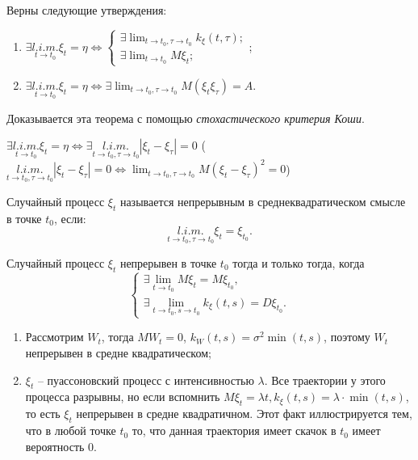 \begin{theorem}
  Верны следующие утверждения:

  \begin{enumerate}
    \item $\exists \underset{t \to t_0}{l.i.m.} \xi_t = \eta \Leftrightarrow
      \begin{cases}
        \exists \lim_{t\to t_0, \tau \to t_0} k_{\xi} (t, \tau); \\
        \exists \lim_{t\to t_0} M \xi_t;
      \end{cases}$;
  \item $\exists \underset{t \to t_0}{l.i.m.} \xi_t = \eta \Leftrightarrow
    \exists \lim_{t\to t_0, \tau \to t_0} M(\xi_t \xi_\tau) = A$.
  \end{enumerate}
\end{theorem}

Доказывается эта теорема с помощью \emph{стохастического критерия Коши}.

\begin{theorem}
  $\exists \underset{t \to t_0}{l.i.m.} \xi_t = \eta \Leftrightarrow
  \exists \underset{t \to t_0, \tau \to t_0}{l.i.m.} |\xi_t - \xi_\tau| = 0$
  ($\underset{t \to t_0, \tau \to t_0}{l.i.m.} |\xi_t - \xi_\tau| = 0
  \Leftrightarrow \lim_{t\to t_0, \tau\to t_0} M(\xi_t - \xi_\tau)^2 = 0$)
\end{theorem}


\begin{definition}
  Случайный процесс $\xi_t$ называется непрерывным в среднеквадратическом смысле
  в точке $t_0$, если:
  \[
    \underset{t \to t_0, \tau \to t_0}{l.i.m.} \xi_t = \xi_{t_0}.
  \]
\end{definition}

\begin{theorem}
  Случайный процесс $\xi_t$ непрерывен в точке $t_0$ тогда и только тогда, когда
  \[
    \begin{cases}
      \exists \lim_{t \to t_0} M\xi_t = M\xi_{t_0}, \\
      \exists \lim_{t \to t_0, s\to t_0} k_\xi(t, s) = D\xi_{t_0}.
    \end{cases}
  \]
\end{theorem}

\begin{ex}
  \begin{enumerate}
    \item Рассмотрим $W_t$, тогда $MW_t = 0$, $k_W(t, s) = \sigma^2 \min(t, s)$,
      поэтому $W_t$ непрерывен в средне квадратическом;
    \item $\xi_t$ -- пуассоновский процесс с интенсивностью $\lambda$. Все траектории у 
      этого процесса разрывны, но если вспомнить $M\xi_t = \lambda t, k_\xi(t, s) = \lambda \cdot \min(t, s)$, то есть $\xi_t$ непрерывен в средне квадратичном.
      Этот факт иллюстрируется тем, что в любой точке $t_0$ то, что
      данная траектория имеет скачок в $t_0$ имеет вероятность $0$.
  \end{enumerate}
\end{ex}
